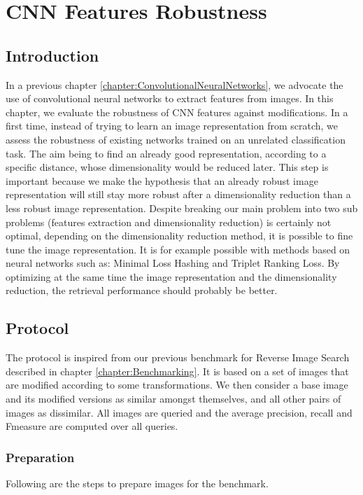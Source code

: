 \chapter{CNN Features Robustness}

\label{chapter:CNNFeaturesRobustness}


\section{Introduction}
In a previous chapter \ref{chapter:ConvolutionalNeuralNetworks}, we advocate the use of convolutional neural networks to extract features from images. In this chapter, we evaluate the robustness of CNN features against modifications. In a first time, instead of trying to learn an image representation from scratch, we assess the robustness of existing networks trained on an unrelated classification task. The aim being to find an already good representation, according to a specific distance, whose dimensionality would be reduced later. This step is important because we make the hypothesis that an already robust image representation will still stay more robust after a dimensionality reduction than a less robust image representation. Despite breaking our main problem into two sub problems (features extraction and dimensionality reduction) is certainly not optimal, depending on the dimensionality reduction method, it is possible to fine tune the image representation. It is for example possible with methods based on neural networks such as: Minimal Loss Hashing and Triplet Ranking Loss. By optimizing at the same time the image representation and the dimensionality reduction, the retrieval performance should probably be better.

\section{Protocol}
The protocol is inspired from our previous benchmark for Reverse Image Search described in chapter \ref{chapter:Benchmarking}. It is based on a set of images that are modified according to some transformations. We then consider a base image and its modified versions as similar amongst themselves, and all other pairs of images as dissimilar. All images are queried and the average precision, recall and Fmeasure are computed over all queries.

\subsection{Preparation}
Following are the steps to prepare images for the benchmark.

